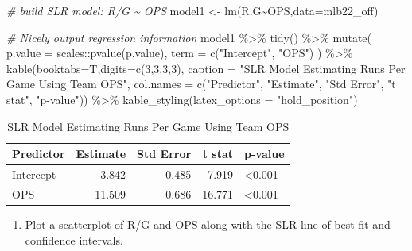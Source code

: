 \documentclass[
  11pt,
]{book}
\newenvironment{Shaded}{\begin{snugshade}}{\end{snugshade}}
\newcommand{\AttributeTok}[1]{\textcolor[rgb]{0.77,0.63,0.00}{#1}}
\newcommand{\CommentTok}[1]{\textcolor[rgb]{0.56,0.35,0.01}{\textit{#1}}}
\newcommand{\DecValTok}[1]{\textcolor[rgb]{0.00,0.00,0.81}{#1}}
\newcommand{\FunctionTok}[1]{\textcolor[rgb]{0.00,0.00,0.00}{#1}}
\newcommand{\NormalTok}[1]{#1}
\newcommand{\OtherTok}[1]{\textcolor[rgb]{0.56,0.35,0.01}{#1}}
\newcommand{\SpecialCharTok}[1]{\textcolor[rgb]{0.00,0.00,0.00}{#1}}
\newcommand{\StringTok}[1]{\textcolor[rgb]{0.31,0.60,0.02}{#1}}
\providecommand{\tightlist}{%
  \setlength{\itemsep}{0pt}\setlength{\parskip}{0pt}}
\theoremstyle{definition}
\theoremstyle{definition}
\theoremstyle{definition}
\theoremstyle{definition}
\theoremstyle{remark}
\begin{document}
\begin{Shaded}
\begin{Highlighting}[]
\CommentTok{\# build SLR model: R/G \textasciitilde{} OPS}
\NormalTok{model1 }\OtherTok{\textless{}{-}} \FunctionTok{lm}\NormalTok{(R.G}\SpecialCharTok{\textasciitilde{}}\NormalTok{OPS,}\AttributeTok{data=}\NormalTok{mlb22\_off)}

\CommentTok{\# Nicely output regression information}
\NormalTok{model1 }\SpecialCharTok{\%\textgreater{}\%} \FunctionTok{tidy}\NormalTok{() }\SpecialCharTok{\%\textgreater{}\%}
  \FunctionTok{mutate}\NormalTok{(}
    \AttributeTok{p.value =}\NormalTok{ scales}\SpecialCharTok{::}\FunctionTok{pvalue}\NormalTok{(p.value),}
    \AttributeTok{term =} \FunctionTok{c}\NormalTok{(}\StringTok{"Intercept"}\NormalTok{, }\StringTok{"OPS"}\NormalTok{)}
\NormalTok{  ) }\SpecialCharTok{\%\textgreater{}\%}
  \FunctionTok{kable}\NormalTok{(}\AttributeTok{booktabs=}\NormalTok{T,}\AttributeTok{digits=}\FunctionTok{c}\NormalTok{(}\DecValTok{3}\NormalTok{,}\DecValTok{3}\NormalTok{,}\DecValTok{3}\NormalTok{,}\DecValTok{3}\NormalTok{), }
        \AttributeTok{caption =} \StringTok{"SLR Model Estimating Runs Per Game Using Team OPS"}\NormalTok{,}
        \AttributeTok{col.names =} \FunctionTok{c}\NormalTok{(}\StringTok{"Predictor"}\NormalTok{, }\StringTok{"Estimate"}\NormalTok{, }\StringTok{"Std Error"}\NormalTok{, }\StringTok{"t stat"}\NormalTok{, }\StringTok{"p{-}value"}\NormalTok{)) }\SpecialCharTok{\%\textgreater{}\%}
  \FunctionTok{kable\_styling}\NormalTok{(}\AttributeTok{latex\_options =} \StringTok{"hold\_position"}\NormalTok{)}
\end{Highlighting}
\end{Shaded}

\begin{table}[!h]

\caption{\label{tab:unnamed-chunk-225}SLR Model Estimating Runs Per Game Using Team OPS}
\centering
\begin{tabular}[t]{lrrrl}
\toprule
Predictor & Estimate & Std Error & t stat & p-value\\
\midrule
Intercept & -3.842 & 0.485 & -7.919 & <0.001\\
OPS & 11.509 & 0.686 & 16.771 & <0.001\\
\bottomrule
\end{tabular}
\end{table}

\newpage

\begin{enumerate}
\def\labelenumi{(\alph{enumi})}
\setcounter{enumi}{3}
\tightlist
\item
  Plot a scatterplot of R/G and OPS along with the SLR line of best fit and confidence intervals.
\end{enumerate}
\end{document}
